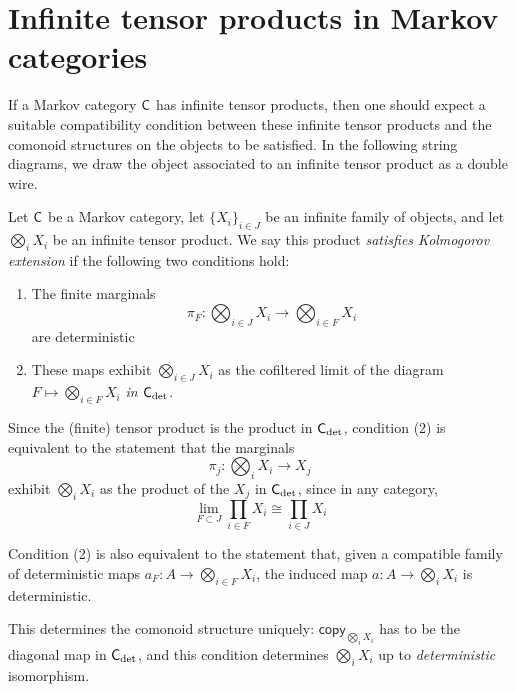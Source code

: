 \documentclass[11pt]{article}
\begin{document}
\section{Infinite tensor products in Markov categories}
\label{infprod_markov}

If a Markov category $\mathsf{C}$ has infinite tensor products, then one should expect a suitable compatibility condition between these infinite tensor products and the comonoid structures on the objects to be satisfied. In the following string diagrams, we draw the object associated to an infinite tensor product as a double wire.

\begin{definition}
    \label{defn_kolmogorov_ext}
    Let $\mathsf{C}$ be a Markov category, let $\{X_i\}_{i\in J}$ be an infinite family of objects, and let $\bigotimes_i X_i$ be an infinite tensor product.
    We say this product \emph{satisfies Kolmogorov extension} if the following two conditions hold:
    \begin{enumerate}[(1)]
        \item The finite marginals \[\pi_F: \bigotimes_{i\in J} X_i \to \bigotimes_{i \in F} X_i\] are deterministic
        \item These maps exhibit $\bigotimes_{i\in J} X_i$ as the cofiltered limit of the diagram $F \mapsto \bigotimes_{i \in F} X_i$ \emph{in $\mathsf{C}_{\rm det}$}.
    \end{enumerate}
\end{definition}


\begin{remark}
    Since the (finite) tensor product is the product in $\mathsf{C}_{\rm det}$, condition (2) is equivalent to the statement that the marginals
    \[\pi_j: \bigotimes_i X_i \to X_j\]
    exhibit $\bigotimes_i X_i$ as the product of the $X_j$ in $\mathsf{C}_{\rm det}$,
    since in any category, \[\lim_{F \subset J} \prod_{i \in F}X_i \cong \prod_{i \in J}X_i\]
\end{remark}

\begin{remark}
    Condition (2) is also equivalent to the statement that, given a compatible family of deterministic maps $a_F: A \to \bigotimes_{i \in F} X_i$, the induced map $a: A \to \bigotimes_i X_i$ is deterministic.
\end{remark}


This determines the comonoid structure uniquely: $\mathsf{copy}_{\bigotimes_i X_i}$ has to be the diagonal map in $\mathsf{C}_{\rm det}$,
and this condition determines $\bigotimes_i X_i$ up to \emph{deterministic} isomorphism.
\end{document}
